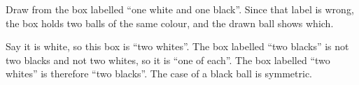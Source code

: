 Draw from the box labelled ``one white and one black''. Since that label is wrong, the box holds two balls of the same colour, and the drawn ball shows which.

Say it is white, so this box is ``two whites''. The box labelled ``two blacks'' is not two blacks and not two whites, so it is ``one of each''. The box labelled ``two whites'' is therefore ``two blacks''. The case of a black ball is symmetric.
